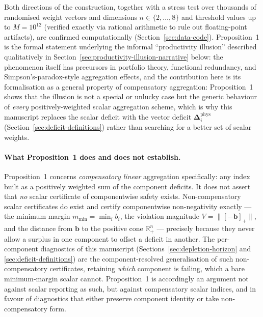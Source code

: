 \documentclass[twocolumn,10pt]{article}
\begin{document}
Both directions of the construction, together with a stress test over thousands of randomised weight vectors and dimensions $n\in\{2,\dots,8\}$ and threshold values up to $M=10^{12}$ (verified exactly via rational arithmetic to rule out floating-point artifacts), are confirmed computationally (Section~\ref{sec:data-code}). Proposition~1 is the formal statement underlying the informal ``productivity illusion'' described qualitatively in Section~\ref{sec:productivity-illusion-narrative} below: the phenomenon itself has precursors in portfolio theory, functional redundancy, and Simpson's-paradox-style aggregation effects, and the contribution here is its formalisation as a general property of compensatory aggregation: Proposition~1 shows that the illusion is not a special or unlucky case but the generic behaviour of \emph{every} positively-weighted scalar aggregation scheme, which is why this manuscript replaces the scalar deficit with the vector deficit $\boldsymbol\Delta_i^{\text{phys}}$ (Section~\ref{sec:deficit-definitions}) rather than searching for a better set of scalar weights.

\paragraph{What Proposition~1 does and does not establish.} Proposition~1 concerns \emph{compensatory linear} aggregation specifically: any index built as a positively weighted sum of the component deficits. It does not assert that \emph{no} scalar certificate of componentwise safety exists. Non-compensatory scalar certificates do exist and certify componentwise non-negativity exactly --- the minimum margin $m_{\min}=\min_i b_i$, the violation magnitude $V=\|[-\mathbf b]_+\|$, and the distance from $\mathbf b$ to the positive cone $\mathbb R_+^n$ --- precisely because they never allow a surplus in one component to offset a deficit in another. The per-component diagnostics of this manuscript (Sections~\ref{sec:depletion-horizon} and \ref{sec:deficit-definitions}) are the component-resolved generalisation of such non-compensatory certificates, retaining \emph{which} component is failing, which a bare minimum-margin scalar cannot. Proposition~1 is accordingly an argument not against scalar reporting as such, but against compensatory scalar indices, and in favour of diagnostics that either preserve component identity or take non-compensatory form.
\end{document}
